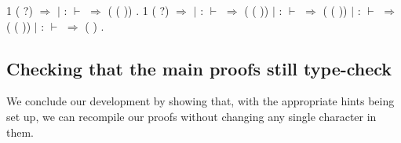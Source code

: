 \documentclass[12pt]{report}
\begin{document}
\begin{coqdoccode}
\coqdocemptyline
\coqdocnoindent
{} 1 ( ?) \ensuremath{\Rightarrow}\coqdoceol
\coqdocindent{1.00em}
  \coqdoceol
\coqdocindent{1.00em}
\ensuremath{|} :   \coqdocvar{\_} \coqdocvar{\_} \ensuremath{\vdash} \coqdocvar{\_} \ensuremath{\Rightarrow}  ( ( ))\coqdoceol
\coqdocindent{1.00em}
.\coqdoceol
\coqdocemptyline
\coqdocnoindent
{} 1 ( ?) \ensuremath{\Rightarrow}\coqdoceol
\coqdocindent{1.00em}
  \coqdoceol
\coqdocindent{1.00em}
\ensuremath{|} :  \coqdocvar{\_}  \coqdocvar{\_} \ensuremath{\vdash} \coqdocvar{\_} \ensuremath{\Rightarrow}  ( ( ))\coqdoceol
\coqdocindent{1.00em}
\ensuremath{|} :   \coqdocvar{\_} \ensuremath{\vdash} \coqdocvar{\_} \ensuremath{\Rightarrow}  ( ( ))\coqdoceol
\coqdocindent{1.00em}
\ensuremath{|} :  \coqdocvar{\_}  \ensuremath{\vdash} \coqdocvar{\_} \ensuremath{\Rightarrow}  ( ( ))\coqdoceol
\coqdocindent{1.00em}
\ensuremath{|} :   \ensuremath{\vdash} \coqdocvar{\_} \ensuremath{\Rightarrow}  ( )\coqdoceol
\coqdocindent{1.00em}
.\coqdoceol
\coqdocemptyline
\end{coqdoccode}
\subsection{Checking that the main proofs still type-check}



 We conclude our development by showing that, with the appropriate
    hints being set up, we can recompile our proofs without changing 
    any single character in them.
\end{document}
